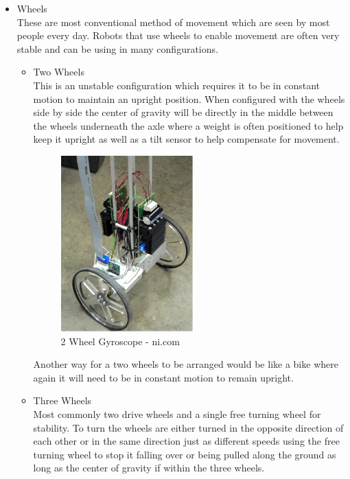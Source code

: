 \begin{itemize}
\item Wheels
\\These are most conventional method of movement which are seen by most people every day.  Robots that use wheels to enable movement are often very stable and can be using in many configurations.
	\begin{itemize}
	\item Two Wheels
	\\This is an unstable configuration which requires it to be in constant motion to maintain an upright position.  When configured with the wheels side by side the center of gravity will be directly in the middle between the wheels underneath the axle where a weight is often positioned to help keep it upright as well as a tilt sensor to help compensate for movement.
\begin{figure}[h]
\centering
        \includegraphics[width=2.0in] {Images/2-wheel-side.png}
        \caption{2 Wheel Gyroscope - ni.com}
        \label{2 Wheel Gyroscope}
\end{figure}
Another way for a two wheels to be arranged would be like a bike where again it will need to be in constant motion to remain upright.


	\item Three Wheels
	\\Most commonly two drive wheels and a single free turning wheel for stability.  To turn the wheels are either turned in the opposite direction of each other or in the same direction just as different speeds using the free turning wheel to stop it falling over or being pulled along the ground as long as the center of gravity if within the three wheels.


\end{itemize}
\end{itemize}
